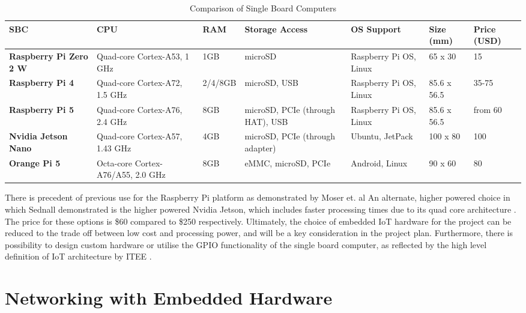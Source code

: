 \begin{table}[h!]
    \centering
    \begin{tabularx}{\textwidth}{|p{3cm}|X|X|X|X|X|p{2cm}|}
    \hline
    \textbf{SBC} & \textbf{CPU} & \textbf{RAM} & \textbf{Storage Access} & \textbf{OS Support} & \textbf{Size (mm)} & \textbf{Price (USD)} \\
    \hline
    \textbf{Raspberry Pi Zero 2 W} & Quad-core Cortex-A53, 1 GHz & 1GB & microSD & Raspberry Pi OS, Linux & 65 x 30 & 15 \\
    \hline
    \textbf{Raspberry Pi 4} & Quad-core Cortex-A72, 1.5 GHz & 2/4/8GB & microSD, USB & Raspberry Pi OS, Linux & 85.6 x 56.5 & 35-75 \\
    \hline
    \textbf{Raspberry Pi 5} & Quad-core Cortex-A76, 2.4 GHz & 8GB & microSD, PCIe (through HAT), USB & Raspberry Pi OS, Linux & 85.6 x 56.5 & from 60 \\
    \hline
    \textbf{Nvidia Jetson Nano} & Quad-core Cortex-A57, 1.43 GHz & 4GB & microSD, PCIe (through adapter) & Ubuntu, JetPack & 100 x 80 & 100 \\
    \hline
    \textbf{Orange Pi 5} & Octa-core Cortex-A76/A55, 2.0 GHz & 8GB & eMMC, microSD, PCIe & Android, Linux & 90 x 60 & 80 \\
    \hline
    \end{tabularx}
    \caption{Comparison of Single Board Computers \cite{sbc_hardware}}
    \label{tab:sbc_comparison}
    
\end{table}


\par \vspace{0.5cm} 
\noindent There is precedent of previous use for the Raspberry Pi platform as demonstrated by Moser et. al \cite{IOTpassiveRadar} An alternate, higher powered choice in which Sednall demonstrated is the higher powered Nvidia Jetson, which includes faster processing times due to its quad core architecture \cite{FMlowCost}. The price for these options is \$60 compared to \$250 respectively. Ultimately, the choice of embedded IoT hardware for the project can be reduced to the trade off between low cost and processing power, and will be a key consideration in the project plan. Furthermore, there is possibility to design custom hardware or utilise the GPIO functionality of the single board computer, as reflected by the high level definition of IoT architecture by ITEE \cite{IoTdefinition}.

\section{Networking with Embedded Hardware}

